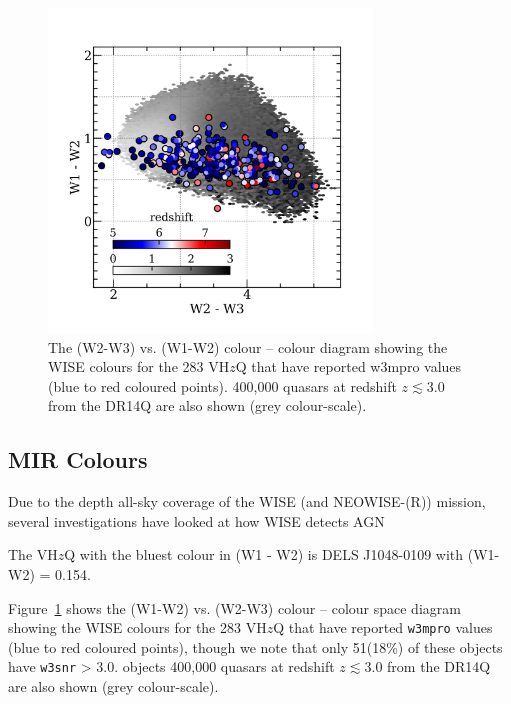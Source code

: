 \documentclass[usenatbib]{mnras}
\begin{document}
\begin{figure}
    \centering
    \includegraphics[width=8.6cm,  clip, trim=6mm 4mm 6mm 10mm]
    {../color_color/W1W2_plots/W1W2W3/W1W2W3_hexplots_20190610v2.png} 
  \vspace{-14pt}
    \caption{The (W2-W3) vs. (W1-W2) colour – colour diagram showing the WISE colours 
      for the 283 VH$z$Q that have reported w3mpro values (blue to red coloured points).
      400,000 quasars at redshift $z\lesssim3.0$ from the DR14Q are also shown
      (grey colour-scale). }
    \label{fig:W1W2W3}
\end{figure}
\subsection{MIR Colours}
Due to the depth all-sky coverage of the WISE (and NEOWISE-(R)) mission, 
several investigations have looked at how WISE detects AGN 
\citet[e.g][]{Stern2012, Assef2012, Secrest2015, LaMassa2017, Assef2018, Glikman2018, LaMassa2019} 

The VH$z$Q with the bluest colour in (W1 - W2) is 
DELS J1048-0109 with (W1-W2) = 0.154. 

Figure~\ref{fig:W1W2W3} shows the (W1-W2) vs. (W2-W3) colour – colour space diagram showing the WISE colours for the 283 VH$z$Q that have reported {\tt w3mpro} values (blue to red coloured points), though we note that only 51(18\%) of these objects have {\tt w3snr} > 3.0.  objects  400,000 quasars
at redshift $z\lesssim3.0$ from the DR14Q are also shown (grey
colour-scale). 
\end{document}
